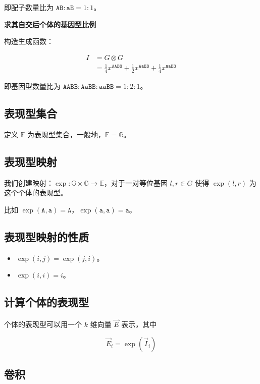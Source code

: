 \documentclass{article}
\begin{document}
即配子数量比为 $\texttt{AB} : \texttt{aB}=1:1$。

\textbf{求其自交后个体的基因型比例}

构造生成函数：

$$\begin{aligned}
	I &= G \otimes G \\
		&= \frac{1}{4} x^{\texttt{AABB}} + \frac{1}{2} x^{\texttt{AaBB}} + \frac{1}{4} x^{\texttt{aaBB}}
\end{aligned}$$

即基因型数量比为 $\texttt{AABB} : \texttt{AaBB} : \texttt{aaBB}=1:2:1$。

\subsection{表现型集合}

定义 $\mathbb{E}$ 为表现型集合，一般地，$\mathbb{E}=\mathbb{G}$。

\subsection{表现型映射}

我们创建映射：$\operatorname{exp}:\mathbb{G} \times \mathbb{G} \to \mathbb{E}$，对于一对等位基因 $l,r \in G$ 使得 $\operatorname{exp}(l,r)$ 为这个个体的表现型。

比如 $\operatorname{exp}(\texttt{A},\texttt{a})=\texttt{A}$，$\operatorname{exp}(\texttt{a},\texttt{a})=\texttt{a}$。

\subsection{表现型映射的性质}

\begin{itemize}
	\item $\operatorname{exp}(i,j)=\operatorname{exp}(j,i)$。
	\item $\operatorname{exp}(i,i)=i$。
\end{itemize}

\subsection{计算个体的表现型}

个体的表现型可以用一个 $k$ 维向量 $\vec E$ 表示，其中

$$\vec E_i=\operatorname{exp}(\vec I_i)$$

\subsection{卷积}
\end{document}
